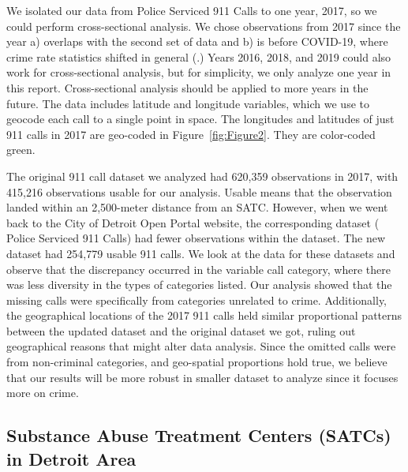\documentclass[12pt]{article}
\begin{document}
We isolated our data from Police Serviced 911 Calls to one year, 2017, so we could perform cross-sectional analysis. We chose observations from 2017 since the year a) overlaps with the second set of data and b) is before COVID-19, where crime rate statistics shifted in general (\citealp{covid_and_crime}.)  Years 2016, 2018, and 2019 could also work for cross-sectional analysis, but for simplicity, we only analyze one year in this report. Cross-sectional analysis should be applied to more years in the future. The data includes latitude and longitude variables, which we use to geocode each call to a single point in space. The longitudes and latitudes of just 911 calls in 2017 are geo-coded in Figure~\ref{fig:Figure2}. They are color-coded green. 

The original 911 call dataset we analyzed had 620,359 observations in 2017, with 415,216 observations usable for our analysis.  Usable means that the observation landed within an 2,500-meter distance from an SATC. However, when we went back to the City of Detroit Open Portal website, the corresponding dataset ( Police Serviced 911 Calls) had fewer observations within the dataset. The new dataset had 254,779 usable 911 calls. We look at the data for these datasets and observe that the discrepancy occurred in the variable call category, where there was less diversity in the types of categories listed. Our analysis showed that the missing calls were specifically from categories unrelated to crime.  Additionally, the geographical locations of the 2017 911 calls held similar proportional patterns between the updated dataset and the original dataset we got, ruling out geographical reasons that might alter data analysis. Since the omitted calls were from non-criminal categories, and geo-spatial proportions hold true, we believe that our results will be more robust in smaller dataset to analyze since it focuses more on crime.\footnotemark[1]

\subsection{Substance Abuse Treatment Centers (SATCs) in Detroit Area}
\end{document}
